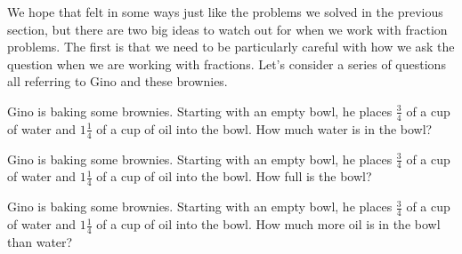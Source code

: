 \documentclass{ximera}
\begin{document}
We hope that felt in some ways just like the problems we solved in the previous section, but there are two big ideas to watch out for when we work with fraction problems. The first is that we need to be particularly careful with how we ask the question when we are working with fractions. Let's consider a series of questions all referring to Gino and these brownies.

\begin{question}
Gino is baking some brownies. Starting with an empty bowl, he places $\frac{3}{4}$ of a cup of water and $1 \frac{1}{4}$ of a cup of oil into the bowl. How much water is in the bowl?

\begin{multipleChoice}
\end{multipleChoice}
\end{question}


\begin{question}
Gino is baking some brownies. Starting with an empty bowl, he places $\frac{3}{4}$ of a cup of water and $1 \frac{1}{4}$ of a cup of oil into the bowl. How full is the bowl?

\begin{multipleChoice}
\end{multipleChoice}
\end{question}


\begin{question}
Gino is baking some brownies. Starting with an empty bowl, he places $\frac{3}{4}$ of a cup of water and $1 \frac{1}{4}$ of a cup of oil into the bowl. How much more oil is in the bowl than water?

\begin{multipleChoice}
\end{multipleChoice}
\end{question}
\end{document}
